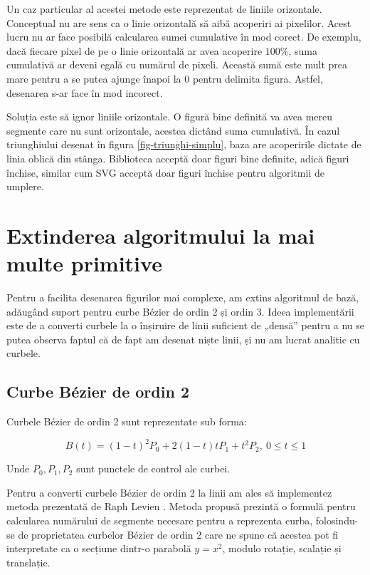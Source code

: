\documentclass[a4paper, 12pt]{report}
\begin{document}
Un caz particular al acestei metode este reprezentat de liniile orizontale. Conceptual nu are sens ca o linie
orizontală să aibă acoperiri ai pixelilor. Acest lucru nu ar face posibilă calcularea sumei cumulative în mod corect.
De exemplu, dacă fiecare pixel de pe o linie orizontală ar avea acoperire \(100\%\), suma cumulativă ar deveni egală
cu numărul de pixeli. Această sumă este mult prea mare pentru a se putea ajunge înapoi la 0 pentru delimita figura.
Astfel, desenarea s-ar face în mod incorect.

Soluția este să ignor liniile orizontale. O figură bine definită va avea mereu segmente care nu sunt orizontale,
acestea dictând suma cumulativă. În cazul triunghiului desenat în figura \ref{fig-triunghi-simplu}, baza are acoperirile
dictate de linia oblică din stânga. Biblioteca acceptă doar figuri bine definite, adică figuri închise, similar cum SVG
acceptă doar figuri închise pentru algoritmii de umplere.

\chapter{Extinderea algoritmului la mai multe primitive}

Pentru a facilita desenarea figurilor mai complexe, am extins algoritmul de bază, adăugând suport pentru curbe Bézier
de ordin 2 și ordin 3. Ideea implementării este de a converti curbele la o înșiruire de linii suficient de „densă” pentru
a nu se putea observa faptul că de fapt am desenat niște linii, și nu am lucrat analitic cu curbele.

\section{Curbe Bézier de ordin 2}

Curbele Bézier de ordin 2 sunt reprezentate sub forma:

\[
    B(t) = (1 - t)^2 P_0 + 2 (1 - t) t P_1 + t^2 P_2, \ 0 \leq t \leq 1
\]

Unde \(P_0, P_1, P_2\) sunt punctele de control ale curbei.

Pentru a converti curbele Bézier de ordin 2 la linii am ales să implementez metoda prezentată de Raph Levien
\cite{FlatteningQuadraticBezierCurves}. Metoda propusă prezintă o formulă pentru calcularea numărului de segmente
necesare pentru a reprezenta curba, folosindu-se de proprietatea curbelor Bézier de ordin 2 care ne spune că acestea
pot fi interpretate ca o secțiune dintr-o parabolă \(y = x^2\), modulo rotație, scalație și translație.
\end{document}
